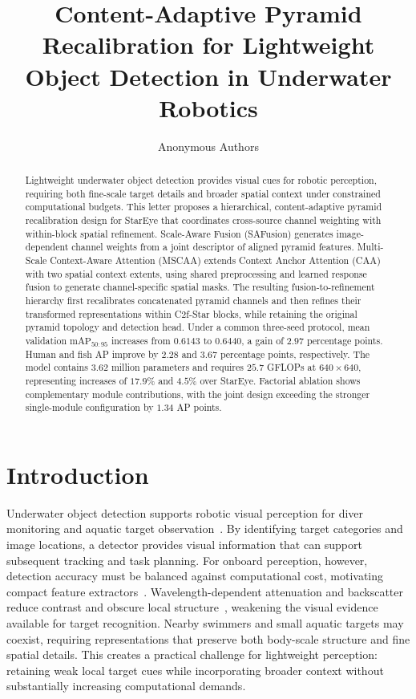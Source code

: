 \documentclass[letterpaper,10pt,conference]{ieeeconf}
\title{\LARGE\bfseries
Content-Adaptive Pyramid Recalibration for Lightweight
Object Detection in Underwater Robotics}
\author{Anonymous Authors}
\begin{document}
\maketitle
\thispagestyle{empty}
\pagestyle{empty}

\begin{abstract}
Lightweight underwater object detection provides visual cues for robotic perception, requiring both fine-scale target details and broader spatial context under constrained computational budgets. This letter proposes a hierarchical, content-adaptive pyramid recalibration design for StarEye that coordinates cross-source channel weighting with within-block spatial refinement. Scale-Aware Fusion (SAFusion) generates image-dependent channel weights from a joint descriptor of aligned pyramid features. Multi-Scale Context-Aware Attention (MSCAA) extends Context Anchor Attention (CAA) with two spatial context extents, using shared preprocessing and learned response fusion to generate channel-specific spatial masks. The resulting fusion-to-refinement hierarchy first recalibrates concatenated pyramid channels and then refines their transformed representations within C2f-Star blocks, while retaining the original pyramid topology and detection head. Under a common three-seed protocol, mean validation \(\mathrm{mAP}_{50:95}\) increases from \(0.6143\) to \(0.6440\), a gain of \(2.97\) percentage points. Human and fish AP improve by \(2.28\) and \(3.67\) percentage points, respectively. The model contains \(3.62\) million parameters and requires \(25.7\) GFLOPs at \(640\times640\), representing increases of \(17.9\%\) and \(4.5\%\) over StarEye. Factorial ablation shows complementary module contributions, with the joint design exceeding the stronger single-module configuration by \(1.34\) AP points.

\end{abstract}


\section{Introduction}
Underwater object detection supports robotic visual perception for
diver monitoring and aquatic target observation~\cite{ref_duo,ref_vddc}.
By identifying target categories and image locations, a detector provides
visual information that can support subsequent tracking and task planning.
For onboard perception, however, detection accuracy must be balanced
against computational cost, motivating compact feature
extractors~\cite{ref_mobilenetv2,ref_ghostnet}.
Wavelength-dependent attenuation and backscatter reduce contrast and
obscure local structure~\cite{ref_jaffe,ref_seathru}, weakening the visual
evidence available for target recognition.
Nearby swimmers and small aquatic targets may coexist, requiring
representations that preserve both body-scale structure and fine spatial
details. This creates a practical challenge for lightweight perception:
retaining weak local target cues while incorporating broader context
without substantially increasing computational demands.
\end{document}
